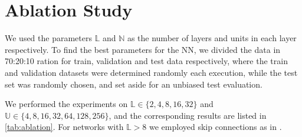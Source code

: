 \section{Ablation Study}
We used the parameters $\mathbb{L}$ and $\mathbb{N}$ as the number of layers and units in each layer respectively. To find the best parameters for the NN, we divided the data in 70:20:10 ration for train, validation and test data respectively, where the train and validation datasets were determined randomly each execution, while the test set was randomly chosen, and set aside for an unbiased test evaluation. 

We performed the experiments on $\mathbb{L} \in \{2, 4, 8, 16, 32\}$ and $\mathbb{U} \in \{4, 8, 16, 32, 64, 128, 256\}$, and the corresponding results are listed in \cref{tab:ablation}. For networks with $\mathbb{L} > 8$ we employed skip connections as in \cite{he2016deep}.

